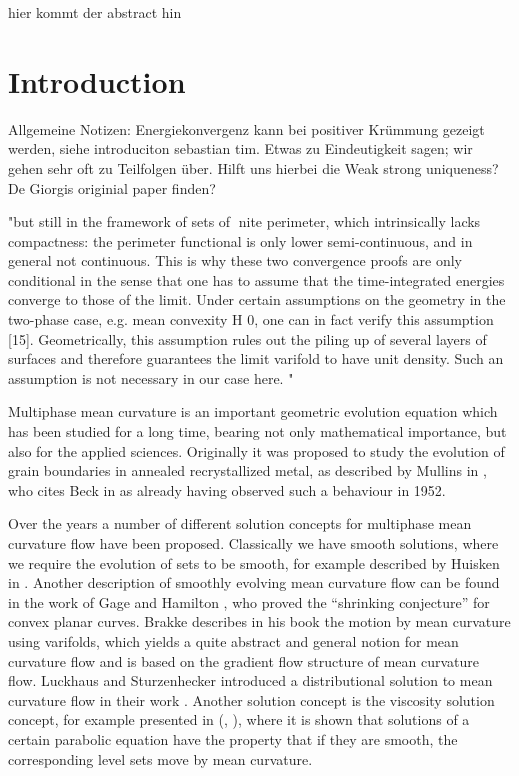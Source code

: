 
hier kommt der abstract hin

\chapter{Introduction}

Allgemeine Notizen: Energiekonvergenz kann bei positiver Krümmung gezeigt 
werden, siehe introduciton sebastian tim. 
Etwas zu Eindeutigkeit sagen; wir gehen sehr oft zu Teilfolgen über. Hilft uns 
hierbei die Weak strong uniqueness?
De Giorgis originial paper finden?

"but still in the framework of sets
of nite perimeter, which intrinsically lacks compactness: the perimeter 
functional is only lower
semi-continuous, and in general not continuous. This is why these two 
convergence proofs are
only conditional in the sense that one has to assume that the time-integrated 
energies converge to
those of the limit. Under certain assumptions on the geometry in the two-phase 
case, e.g. mean
convexity H  0, one can in fact verify this assumption [15]. Geometrically, 
this assumption
rules out the piling up of several layers of surfaces and therefore guarantees 
the limit varifold to
have unit density. Such an assumption is not necessary in our case here.
"

Multiphase mean curvature is an important geometric evolution equation which 
has been studied for a long time, bearing not only mathematical importance, but 
also for the applied sciences. Originally it was proposed to study the 
evolution of grain boundaries in annealed recrystallized metal, as described by
Mullins in \cite{mullins_two_dimensional_motion_of_idealized_grain_boundaries}, 
who cites Beck in \cite{beck_metal_interfaces} as already having observed such 
a behaviour in 1952. 

Over the years a number of different solution concepts for multiphase mean 
curvature flow have been proposed. Classically we have smooth solutions, where 
we require the evolution of sets to be smooth, for example described by Huisken 
in \cite{huisken_asymptotic_behavior_for_singuliarities_of_mcf}. 
Another description of smoothly evolving mean curvature flow can be found in 
the work of Gage and Hamilton 
\cite{gage_hamilton_the_heat_equation_shrinking_convex_plane_curves}, who 
proved the \enquote{shrinking conjecture} for convex planar curves.
Brakke describes in his book 
\cite{brakke_kenneth_motion_of_surface_by_mean_curvature} the motion by mean 
curvature using varifolds, which yields a quite abstract and general notion for 
mean curvature flow and is based on the gradient flow structure of mean 
curvature flow. 
Luckhaus and Sturzenhecker introduced a 
distributional solution to mean curvature flow in their work 
\cite{luckhaus_sturzenhecker_implicit_time_discretization_for_mcf}. Another 
solution concept is the viscosity solution concept, for example presented in 
(\cite{chen_giga_goto_uniqueness_and_existence_of_generalized_mcf_equations},
\cite{evans_spruck_motion_of_level_sets_by_mean_curvature}), where it is shown 
that solutions of a certain parabolic equation have the property that if they 
are smooth, the corresponding level sets move by mean curvature.

